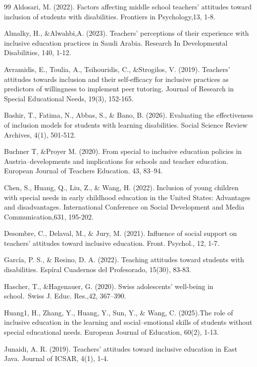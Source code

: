 \documentclass[10pt]{NSP1}
\begin{document}
\begin{thebibliography}{99}
Aldosari, M. (2022). Factors affecting middle school teachers' attitudes toward inclusion of students with disabilities. Frontiers in Psychology,13, 1-8.

Almalky, H., \&Alwahbi,A. (2023). Teachers' perceptions of their experience with inclusive education practices in Saudi Arabia. Research In Developmental Disabilities, 140, 1-12.

Avramidis, E., Toulia, A., Tsihouridis, C., \&Strogilos, V. (2019). Teachers' attitudes towards inclusion and their self-efficacy for inclusive practices as predictors of willingness to implement peer tutoring. Journal of Research in Special Educational Needs, 19(3), 152-165.

Bashir, T., Fatima, N., Abbas, S., \& Bano, B. (2026). Evaluating the effectiveness of inclusion models for students with learning disabilities. Social Science Review Archives, 4(1), 501-512.

Buchner T, \&Proyer M. (2020). From special to inclusive education policies in Austria--developments and implications for schools and teacher education. European Journal of Teachers Education. 43, 83--94.

Chen, S., Huang, Q., Liu, Z., \& Wang, H. (2022). Inclusion of young children with special needs in early childhood education in the United States: Advantages and disadvantages. International Conference on Social Development and Media Communication,631, 195-202.

Desombre, C., Delaval, M., \& Jury, M. (2021). Influence of social support on teachers' attitudes toward inclusive education. Front. Psychol., 12, 1-7.

García, P. S., \& Resino, D. A. (2022). Teaching attitudes toward students with disabilities. Espíral Cuadernos del Profesorado, 15(30), 83-83.

Hascher, T., \&Hagenauer, G. (2020). Swiss adolescents' well-being in school.~Swiss J. Educ. Res.,42, 367--390.

Huang1, H., Zhang, Y., Huang, Y., Sun, Y., \& Wang, C. (2025).The role of inclusive education in the learning and social--emotional skills of students without special educational needs. European Journal of Education, 60(2), 1-13.

Junaidi, A. R. (2019). Teachers' attitudes toward inclusive education in East Java. Journal of ICSAR, 4(1), 1-4.


\end{thebibliography}
\end{document}
